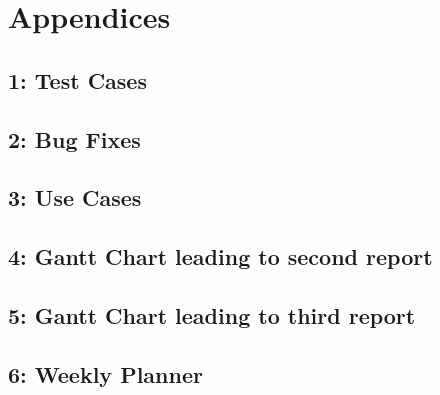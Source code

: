 \section*{Appendices}
		\begin{appendices}
        
            \subsection*{1: Test Cases}
        	
            \newpage
            \subsection*{2: Bug Fixes}
            
            \newpage
            \subsection*{3: Use Cases}
            
            \newpage
			\subsection*{4: Gantt Chart leading to second report} 
			
			\newpage
        	\subsection*{5: Gantt Chart leading to third report} 
            
            \newpage
			\subsection*{6: Weekly Planner}
            
            
            
		\end{appendices}